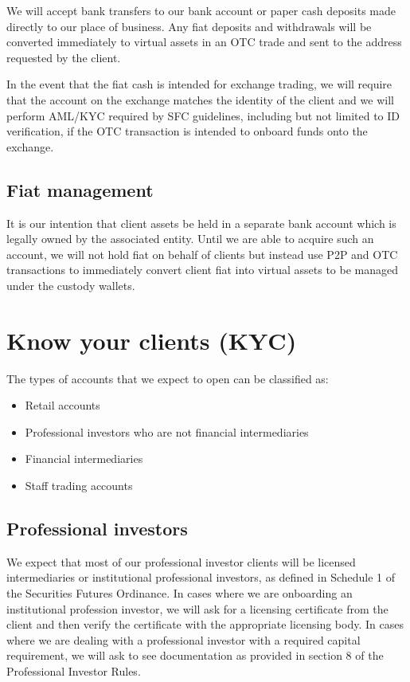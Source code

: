 {We will accept bank transfers to our bank account or paper cash
deposits made directly to our place of business.  Any fiat deposits
and withdrawals will be converted immediately to virtual assets in an
OTC trade and sent to the address requested by the client.

In the event that the fiat cash is intended for exchange trading, we
will require that the account on the exchange matches the identity of
the client and we will perform AML/KYC required by
SFC guidelines, including but not limited to ID verification, if the OTC transaction is intended to onboard funds onto the exchange.

\subsection{Fiat management}
It is our intention that client assets be held in a separate bank
account which is legally owned by the associated entity.  Until we are
able to acquire such an account, we will not hold fiat on behalf of
clients but instead use P2P and OTC transactions to immediately
convert client fiat into virtual assets to be managed under the
custody wallets.
}

\section{Know your clients (KYC)}

The types of accounts that we expect to open can be classified as:

\begin{itemize}
\item Retail accounts
\item Professional investors who are not financial intermediaries
\item Financial intermediaries
\item Staff trading accounts
  \end{itemize}

\subsection{Professional investors}

We expect that most of our professional investor clients will be
licensed intermediaries or institutional professional investors, as
defined in Schedule 1 of the Securities Futures Ordinance.  In cases
where we are onboarding an institutional profession investor, we will
ask for a licensing certificate from the client and then verify the
certificate with the appropriate licensing body.  In cases where we
are dealing with a professional investor with a required capital
requirement, we will ask to see documentation as provided in section
8 of the Professional Investor Rules.

